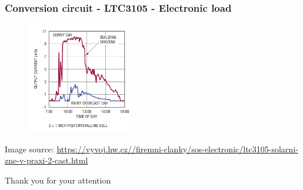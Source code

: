 \documentclass[12;pt,t]{beamer} %
\newcommand{\srctext}[1]{{\fontsize{7}{9}\selectfont\textcolor{sourcesclr}{#1}}}
\begin{document}
\begin{frame}
    \frametitle{Conversion circuit - LTC3105 - Electronic load}    	
        \begin{figure}[H]
            \includegraphics[width=180px]{img/ltc3105-base-circuit-graph.png}
       	\end{figure}
    \srctext{Image source:  \url{https://vyvoj.hw.cz//firemni-clanky/sos-electronic/ltc3105-solarni-zne-v-praxi-2-cast.html}}
\end{frame}

\begin{frame}[fragile]
	\vfill
    \begin{center}
        {\huge Thank you for your attention }
	\end{center}
	\vfill
\end{frame}
\end{document}

